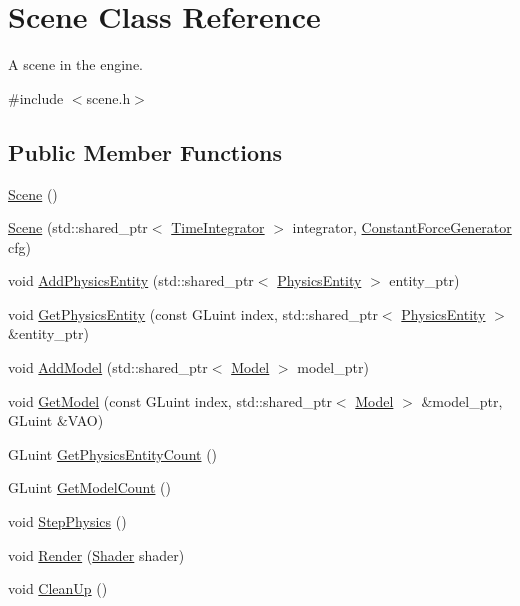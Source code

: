 \hypertarget{classScene}{}\section{Scene Class Reference}
\label{classScene}


A scene in the engine.  




{\ttfamily \#include $<$scene.\+h$>$}

\subsection*{Public Member Functions}
\begin{DoxyCompactItemize}
\item 
\hyperlink{classScene_ad10176d75a9cc0da56626f682d083507}{Scene} ()
\item 
\hyperlink{classScene_a0a3d0bcafa5f18639e2af91c4c43115b}{Scene} (std\+::shared\+\_\+ptr$<$ \hyperlink{classTimeIntegrator}{Time\+Integrator} $>$ integrator, \hyperlink{classConstantForceGenerator}{Constant\+Force\+Generator} cfg)
\item 
void \hyperlink{classScene_a18477e2b5b504b46f3e7d37908abb98d}{Add\+Physics\+Entity} (std\+::shared\+\_\+ptr$<$ \hyperlink{classPhysicsEntity}{Physics\+Entity} $>$ entity\+\_\+ptr)
\item 
void \hyperlink{classScene_ac20558c7452d933ce3ebe8caa1514702}{Get\+Physics\+Entity} (const G\+Luint index, std\+::shared\+\_\+ptr$<$ \hyperlink{classPhysicsEntity}{Physics\+Entity} $>$ \&entity\+\_\+ptr)
\item 
void \hyperlink{classScene_a5419dc941ee6efc29cd5cef8e7d6d414}{Add\+Model} (std\+::shared\+\_\+ptr$<$ \hyperlink{classModel}{Model} $>$ model\+\_\+ptr)
\item 
void \hyperlink{classScene_a031dc667e4152e4bfd2a8930d31320a4}{Get\+Model} (const G\+Luint index, std\+::shared\+\_\+ptr$<$ \hyperlink{classModel}{Model} $>$ \&model\+\_\+ptr, G\+Luint \&V\+AO)
\item 
G\+Luint \hyperlink{classScene_a2cadf8fe478a7e3a270902a0536751a9}{Get\+Physics\+Entity\+Count} ()
\item 
G\+Luint \hyperlink{classScene_a406df661eb7be589964dafe76f7f09c8}{Get\+Model\+Count} ()
\item 
void \hyperlink{classScene_a5fe443641612290ba78931132d1fddb5}{Step\+Physics} ()
\item 
void \hyperlink{classScene_a7edc9fabe7ef61a426cd6278a0b209fe}{Render} (\hyperlink{classShader}{Shader} shader)
\item 
void \hyperlink{classScene_a830078c354d5df8ef9b811dac7b2c7dd}{Clean\+Up} ()
\end{DoxyCompactItemize}


